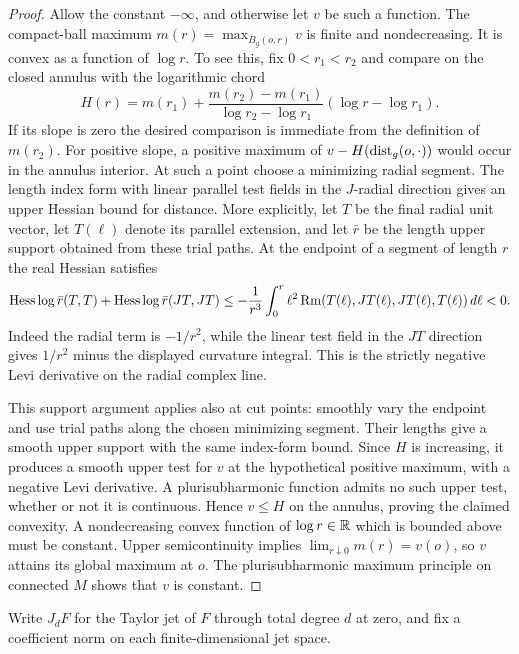 \begin{proof}
Allow the constant $-\infty$, and otherwise let $v$ be such a
function.  The compact-ball maximum
$m(r)=\max_{\overline B_g(o,r)}v$ is finite and nondecreasing.
It is convex as a function of $\log r$.  To see this, fix
$0<r_1<r_2$ and compare on the closed annulus with the
logarithmic chord
\[
 H(r)=m(r_1)
  +\frac{m(r_2)-m(r_1)}{\log r_2-\log r_1}
      (\log r-\log r_1).
\]
If its slope is zero the desired comparison is immediate from
the definition of $m(r_2)$.  For positive slope, a positive
maximum of $v-H(\operatorname{dist}_g(o,\cdot))$ would occur in the annulus
interior.  At such a point choose a minimizing radial segment.
The length index form with linear parallel test fields in the
$J$-radial direction gives an upper Hessian bound for distance.
More explicitly, let $T$ be the final radial unit vector, let
$T(\ell)$ denote its parallel extension, and let $\bar r$ be
the length upper support obtained from these trial paths.  At
the endpoint of a segment of length $r$ the real Hessian satisfies
\[
 \operatorname{Hess}\log\bar r(T,T)
 +\operatorname{Hess}\log\bar r(JT,JT)
 \le-\frac1{r^3}\int_0^r
       \ell^2\operatorname{Rm}(T(\ell),JT(\ell),JT(\ell),T(\ell))\,d\ell<0.
\]
Indeed the radial term is $-1/r^2$, while the linear test field
in the $JT$ direction gives $1/r^2$ minus the displayed
curvature integral.  This is the strictly negative Levi
derivative on the radial complex line.

This support argument applies also at cut points: smoothly vary
the endpoint and use trial paths along the chosen minimizing
segment.  Their lengths give a smooth upper support with the
same index-form bound.  Since $H$ is increasing, it produces
a smooth upper test for $v$ at the hypothetical positive
maximum, with a negative Levi derivative.  A plurisubharmonic
function admits no such upper test, whether or not it is
continuous.  Hence $v\le H$ on the annulus, proving the
claimed convexity.  A nondecreasing convex function of
$\log r\in\mathbb R$ which is bounded above must be constant.
Upper semicontinuity implies
$\lim_{r\downarrow0}m(r)=v(o)$, so $v$ attains its global
maximum at $o$.  The plurisubharmonic maximum principle on
connected $M$ shows that $v$ is constant.
\end{proof}

Write $J_dF$ for the Taylor jet of $F$ through total degree $d$ at zero,
and fix a coefficient norm on each finite-dimensional jet space.

